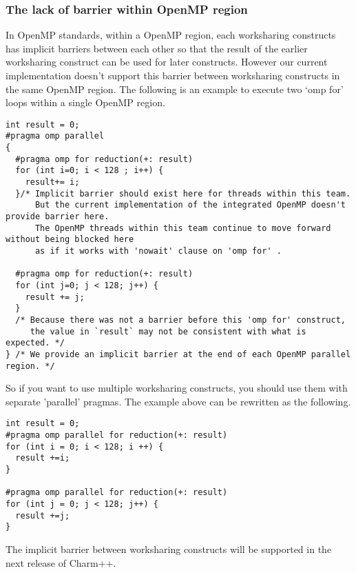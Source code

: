 \subsubsection{The lack of barrier within OpenMP region}
In OpenMP standards, within a OpenMP region, each worksharing constructs has implicit barriers 
between each other so that the result of the earlier worksharing construct can be used for 
later constructs. However our current implementation doesn't support this barrier between 
worksharing constructs in the same OpenMP region. The following is an example to execute 
two `omp for' loops within a single OpenMP region.
\begin{verbatim}
int result = 0;
#pragma omp parallel 
{
  #pragma omp for reduction(+: result)
  for (int i=0; i < 128 ; i++) { 
    result+= i;
  }/* Implicit barrier should exist here for threads within this team.
      But the current implementation of the integrated OpenMP doesn't provide barrier here.
      The OpenMP threads within this team continue to move forward without being blocked here 
      as if it works with 'nowait' clause on 'omp for' .

  #pragma omp for reduction(+: result)
  for (int j=0; j < 128; j++) {
    result += j;
  }
  /* Because there was not a barrier before this 'omp for' construct,
     the value in `result` may not be consistent with what is expected. */
} /* We provide an implicit barrier at the end of each OpenMP parallel region. */
\end{verbatim}

So if you want to use multiple worksharing constructs, you should use them with separate 
'parallel' pragmas. The example above can be rewritten as the following. 
\begin{verbatim}
int result = 0;
#pragma omp parallel for reduction(+: result)
for (int i = 0; i < 128; i ++) {
  result +=i;
}

#pragma omp parallel for reduction(+: result)
for (int j = 0; j < 128; j++) {
  result +=j;
}
\end{verbatim}
The implicit barrier between worksharing constructs will be supported in the next release of Charm++.

